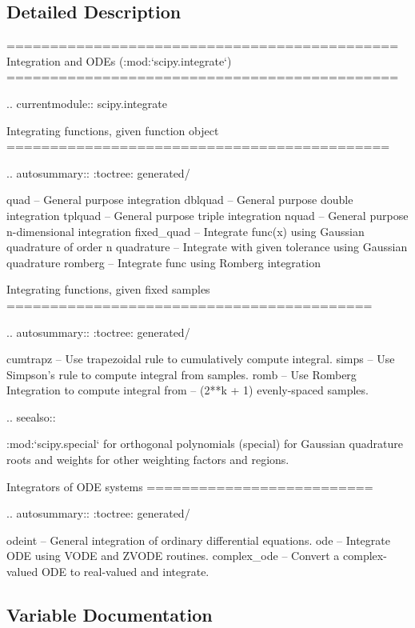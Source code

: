 \subsection{Detailed Description}
\begin{DoxyVerb}=============================================
Integration and ODEs (:mod:`scipy.integrate`)
=============================================

.. currentmodule:: scipy.integrate

Integrating functions, given function object
============================================

.. autosummary::
   :toctree: generated/

   quad          -- General purpose integration
   dblquad       -- General purpose double integration
   tplquad       -- General purpose triple integration
   nquad         -- General purpose n-dimensional integration
   fixed_quad    -- Integrate func(x) using Gaussian quadrature of order n
   quadrature    -- Integrate with given tolerance using Gaussian quadrature
   romberg       -- Integrate func using Romberg integration

Integrating functions, given fixed samples
==========================================

.. autosummary::
   :toctree: generated/

   cumtrapz      -- Use trapezoidal rule to cumulatively compute integral.
   simps         -- Use Simpson's rule to compute integral from samples.
   romb          -- Use Romberg Integration to compute integral from
     -- (2**k + 1) evenly-spaced samples.

.. seealso::

   :mod:`scipy.special` for orthogonal polynomials (special) for Gaussian
   quadrature roots and weights for other weighting factors and regions.

Integrators of ODE systems
==========================

.. autosummary::
   :toctree: generated/

   odeint        -- General integration of ordinary differential equations.
   ode           -- Integrate ODE using VODE and ZVODE routines.
   complex_ode   -- Convert a complex-valued ODE to real-valued and integrate.\end{DoxyVerb}
 

\subsection{Variable Documentation}
\hypertarget{namespacescipy_1_1integrate_ad887b91b6b93340967dfe82daa61ca1b}{}
